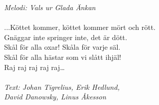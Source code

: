{\footnotesize\textit{Melodi: Vals ur Glada Änkan}}\\
\\
...Köttet kommer, köttet kommer mört och rött.\\
Gnäggar inte springer inte, det är dött.\\
Skål för alla oxar! Skåla för varje säl.\\
Skål för alla hästar som vi slått ihjäl!\\
Raj raj raj raj raj…\\
\\
{\footnotesize\textit{Text: Johan Tigrelius, Erik Hedlund,\\ David Danowsky, Linus Åkesson}}
